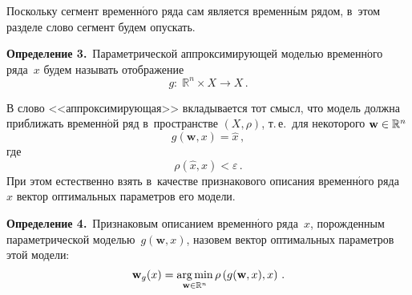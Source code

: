 \begin{multicols}{2}
Поскольку сегмент временн$\acute{\mbox{о}}$го ряда сам является временн$\acute{\mbox{ы}}$м 
рядом, в~этом разделе слово сегмент будем опускать.

\smallskip

\noindent
\textbf{Определение 3.}\
Параметрической аппроксими\-ру\-ющей моделью временн$\acute{\mbox{о}}$го ряда~$x$ будем называть отображение
\begin{equation}
\label{eq:regression}
g:\;\mathbb{R}^n\times X\to X\,.
\end{equation}

\smallskip

В слово <<аппроксимирующая>> вкладывается тот смысл, что модель должна приближать 
временн$\acute{\mbox{о}}$й ряд в~пространстве $(X,\rho)$, т.\,е.\ 
для некоторого $\mathbf{w}\hm\in \mathbb{R}^n$
$$
g(\mathbf{w},x)=\hat{x}\,,
$$
где
$$
\rho(\hat{x},x)<\varepsilon\,.
$$
При этом естественно взять в~качестве признакового описания временн$\acute{\mbox{о}}$го ряда~$x$
 вектор оптимальных параметров его модели.

\smallskip

\noindent
\textbf{Определение 4.}\
Признаковым описанием вре\-мен\-н$\acute{\mbox{о}}$го ряда~$x$, порожденным 
параметрической моделью~$g(\mathbf{w},x)$, назовем вектор оптимальных 
па\-ра\-мет\-ров этой модели:
\begin{equation}
\label{eq:feature_solution}
\mathbf{w}_g(x)=
\mathop{\mathrm{arg}\,\mathrm{min}}_{\mathbf{w}\in \mathbb{R}^n} \rho\left(g(\mathbf{w},x),x\right)\,.
\end{equation}



\end{multicols}
